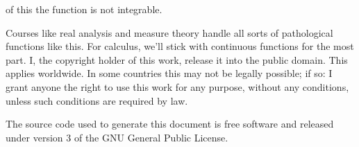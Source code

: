 \documentclass{article}
\theoremstyle{normal}
\theoremstyle{plain}
\begin{document}
    of this the function is not integrable.
    \par\hfill\par
    Courses like real analysis and measure theory handle all sorts of
    pathological functions like this. For calculus, we'll stick with continuous
    functions for the most part.
    \newpage
    I, the copyright holder of this work, release it into the public domain.
    This applies worldwide. In some countries this may not be legally possible;
    if so: I grant anyone the right to use this work for any purpose, without
    any conditions, unless such conditions are required by law.
    \par\hfill\par
    The source code used to generate this document is free software and released
    under version 3 of the GNU General Public License.
\end{document}
